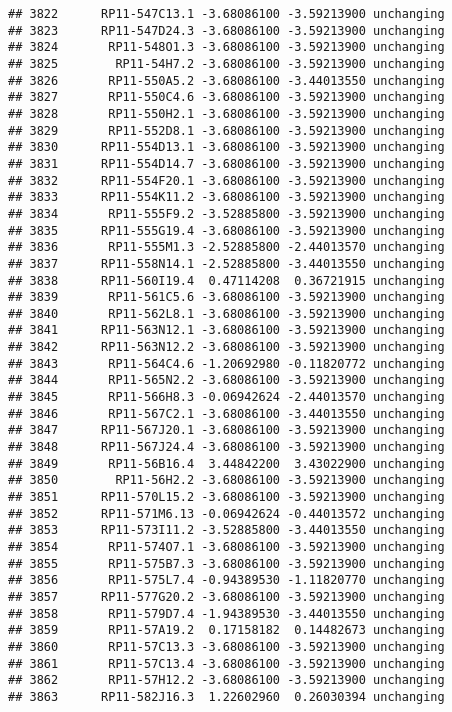 \documentclass[]{article}
\begin{document}
\begin{verbatim}
## 3822      RP11-547C13.1 -3.68086100 -3.59213900 unchanging
## 3823      RP11-547D24.3 -3.68086100 -3.59213900 unchanging
## 3824       RP11-548O1.3 -3.68086100 -3.59213900 unchanging
## 3825        RP11-54H7.2 -3.68086100 -3.59213900 unchanging
## 3826       RP11-550A5.2 -3.68086100 -3.44013550 unchanging
## 3827       RP11-550C4.6 -3.68086100 -3.59213900 unchanging
## 3828       RP11-550H2.1 -3.68086100 -3.59213900 unchanging
## 3829       RP11-552D8.1 -3.68086100 -3.59213900 unchanging
## 3830      RP11-554D13.1 -3.68086100 -3.59213900 unchanging
## 3831      RP11-554D14.7 -3.68086100 -3.59213900 unchanging
## 3832      RP11-554F20.1 -3.68086100 -3.59213900 unchanging
## 3833      RP11-554K11.2 -3.68086100 -3.59213900 unchanging
## 3834       RP11-555F9.2 -3.52885800 -3.59213900 unchanging
## 3835      RP11-555G19.4 -3.68086100 -3.59213900 unchanging
## 3836       RP11-555M1.3 -2.52885800 -2.44013570 unchanging
## 3837      RP11-558N14.1 -2.52885800 -3.44013550 unchanging
## 3838      RP11-560I19.4  0.47114208  0.36721915 unchanging
## 3839       RP11-561C5.6 -3.68086100 -3.59213900 unchanging
## 3840       RP11-562L8.1 -3.68086100 -3.59213900 unchanging
## 3841      RP11-563N12.1 -3.68086100 -3.59213900 unchanging
## 3842      RP11-563N12.2 -3.68086100 -3.59213900 unchanging
## 3843       RP11-564C4.6 -1.20692980 -0.11820772 unchanging
## 3844       RP11-565N2.2 -3.68086100 -3.59213900 unchanging
## 3845       RP11-566H8.3 -0.06942624 -2.44013570 unchanging
## 3846       RP11-567C2.1 -3.68086100 -3.44013550 unchanging
## 3847      RP11-567J20.1 -3.68086100 -3.59213900 unchanging
## 3848      RP11-567J24.4 -3.68086100 -3.59213900 unchanging
## 3849       RP11-56B16.4  3.44842200  3.43022900 unchanging
## 3850        RP11-56H2.2 -3.68086100 -3.59213900 unchanging
## 3851      RP11-570L15.2 -3.68086100 -3.59213900 unchanging
## 3852      RP11-571M6.13 -0.06942624 -0.44013572 unchanging
## 3853      RP11-573I11.2 -3.52885800 -3.44013550 unchanging
## 3854       RP11-574O7.1 -3.68086100 -3.59213900 unchanging
## 3855       RP11-575B7.3 -3.68086100 -3.59213900 unchanging
## 3856       RP11-575L7.4 -0.94389530 -1.11820770 unchanging
## 3857      RP11-577G20.2 -3.68086100 -3.59213900 unchanging
## 3858       RP11-579D7.4 -1.94389530 -3.44013550 unchanging
## 3859       RP11-57A19.2  0.17158182  0.14482673 unchanging
## 3860       RP11-57C13.3 -3.68086100 -3.59213900 unchanging
## 3861       RP11-57C13.4 -3.68086100 -3.59213900 unchanging
## 3862       RP11-57H12.2 -3.68086100 -3.59213900 unchanging
## 3863      RP11-582J16.3  1.22602960  0.26030394 unchanging

\end{verbatim}
\end{document}
